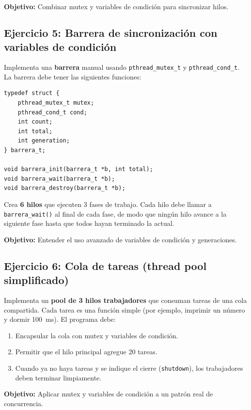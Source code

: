 \documentclass[11pt,a4paper]{article}
\begin{document}
\textbf{Objetivo:} Combinar mutex y variables de condición para sincronizar hilos.

\subsection*{Ejercicio 5: Barrera de sincronización con variables de condición}
Implementa una \textbf{barrera} manual usando \texttt{pthread\_mutex\_t} y \texttt{pthread\_cond\_t}. La barrera debe tener las siguientes funciones:
\begin{lstlisting}
typedef struct {
    pthread_mutex_t mutex;
    pthread_cond_t cond;
    int count;
    int total;
    int generation;
} barrera_t;

void barrera_init(barrera_t *b, int total);
void barrera_wait(barrera_t *b);
void barrera_destroy(barrera_t *b);
\end{lstlisting}
Crea \textbf{6 hilos} que ejecuten 3 fases de trabajo. Cada hilo debe llamar a \texttt{barrera\_wait()} al final de cada fase, de modo que ningún hilo avance a la siguiente fase hasta que todos hayan terminado la actual.

\textbf{Objetivo:} Entender el uso avanzado de variables de condición y generaciones.

\subsection*{Ejercicio 6: Cola de tareas (thread pool simplificado)}
Implementa un \textbf{pool de 3 hilos trabajadores} que consuman tareas de una cola compartida. Cada tarea es una función simple (por ejemplo, imprimir un número y dormir 100~ms). El programa debe:
\begin{enumerate}[label=\alph*)]
    \item Encapsular la cola con mutex y variables de condición.
    \item Permitir que el hilo principal agregue 20 tareas.
    \item Cuando ya no haya tareas y se indique el cierre (\texttt{shutdown}), los trabajadores deben terminar limpiamente.
\end{enumerate}

\textbf{Objetivo:} Aplicar mutex y variables de condición a un patrón real de concurrencia.
\end{document}
